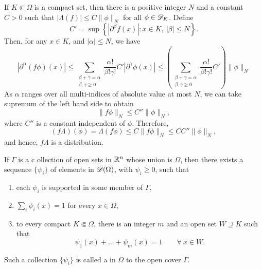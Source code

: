 If $K\Subset\Omega$ is a compact set, then there is a positive integer $N$ and a constant $C > 0$ such that $|\Lambda(f)|\le C\|\phi\|_N$ for all $\phi\in\mathscr{D}_K$. Define 
\begin{equation*}
    C' = \sup\left\{|\partial^\beta f(x)|\colon x\in K,~|\beta|\le N\right\}.
\end{equation*}
Then, for any $x\in K$, and $|\alpha|\le N$, we have
\begin{equation*}
    \left|\partial^\alpha(f\phi)(x)\right|\le\sum_{\substack{\beta + \gamma = \alpha\\\beta,\gamma\ge 0}}\frac{\alpha!}{\beta!\gamma!}C'|\partial^\gamma\phi(x)|\le\left(\sum_{\substack{\beta + \gamma = \alpha\\\beta,\gamma\ge 0}}\frac{\alpha!}{\beta!\gamma!}C'\right)\|\phi\|_N
\end{equation*}
As $\alpha$ ranges over all multi-indices of absolute value at most $N$, we can take supremum of the left hand side to obtain 
\begin{equation*}
    \|f\phi\|_N\le C''\|\phi\|_N,
\end{equation*}
where $C''$ is a constant independent of $\phi$. Therefore, 
\begin{equation*}
    (f\Lambda)(\phi) = \Lambda(f\phi)\le C\|f\phi\|_N\le CC''\|\phi\|_N,
\end{equation*}
and hence, $f\Lambda$ is a distribution.

\begin{theorem}
    If $\Gamma$ is a c ollection of open sets in $\mathbb{R}^n$ whose union is $\Omega$, then there exists a sequence $\{\psi_i\}$ of elements in $\mathscr{D}(\Omega)$, with $\psi_i\ge 0$, such that 
    \begin{enumerate}[label=(\alph*)]
        \item each $\psi_i$ is supported in some member of $\Gamma$, 
        \item $\displaystyle\sum_i\psi_i(x) = 1$ for every $x\in\Omega$, 
        \item to every compact $K\Subset\Omega$, there is an integer $m$ and an open set $W\supseteq K$ such that 
        \begin{equation*}
            \psi_1(x) + \dots + \psi_m(x) = 1\qquad\forall~x\in W.
        \end{equation*}
    \end{enumerate}
    Such a collection $\{\psi_i\}$ is called a  in $\Omega$  to the open cover $\Gamma$.
\end{theorem}

